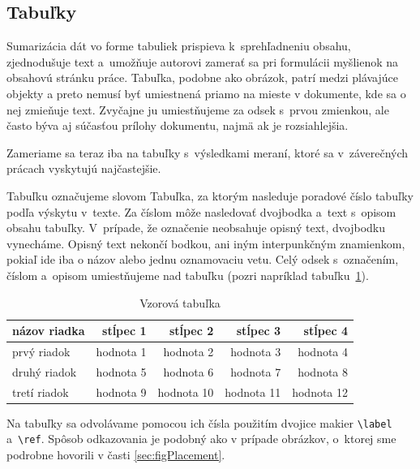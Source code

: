 \documentclass[../../../thesis.tex]{subfiles}
\begin{document}
\subsection{Tabuľky}
Sumarizácia dát vo forme tabuliek prispieva
k~sprehľadneniu obsahu, zjednodušuje text
a~umožňuje autorovi zamerať sa pri formulácii myšlienok na
obsahovú stránku práce.
Tabuľka, podobne ako obrázok, patrí medzi plávajúce objekty
a preto nemusí byť umiestnená priamo na mieste v dokumente,
kde sa o nej zmieňuje text.
Zvyčajne ju umiestňujeme za odsek s~prvou zmienkou,
ale často býva aj súčasťou prílohy dokumentu,
najmä ak je rozsiahlejšia.

Zameriame sa teraz iba na tabuľky s~výsledkami meraní,
ktoré sa v~záverečných prácach vyskytujú najčastejšie.

Tabuľku označujeme slovom Tabuľka,
za ktorým nasleduje poradové číslo tabuľky podľa výskytu
v~texte.
Za číslom môže nasledovať dvojbodka a~text s~opisom obsahu
tabuľky.
V~prípade, že označenie neobsahuje opisný text,
dvojbodku vynecháme.
Opisný text nekončí bodkou,
ani iným interpunkčným znamienkom,
pokiaľ ide iba o názov alebo jednu oznamovaciu vetu.
Celý odsek s~označením, číslom a~opisom umiestňujeme
nad tabuľku (pozri napríklad tabuľku~\ref{tab:template}).

\begin{table}[h!]
  \caption{Vzorová tabuľka}
  \label{tab:template}
  \centering
  \begin{tabular}{@{}lrrrr@{}}
    \toprule
    \textbf{názov riadka} & \textbf{stĺpec 1} & \textbf{stĺpec 2} & \textbf{stĺpec 3} & \textbf{stĺpec 4} \\
    \midrule
    prvý riadok & hodnota 1 & hodnota 2 & hodnota 3 & hodnota 4\\
    druhý riadok & hodnota 5 & hodnota 6 & hodnota 7 & hodnota 8\\
    tretí riadok & hodnota 9 & hodnota 10 & hodnota 11 & hodnota 12\\
    \bottomrule
  \end{tabular}
\end{table}

Na tabuľky sa odvolávame pomocou ich čísla použitím dvojice makier
\verb|\label| a~\verb|\ref|.
Spôsob odkazovania je podobný ako v prípade obrázkov,
o~ktorej sme podrobne hovorili v časti \ref{sec:figPlacement}.
\end{document}

